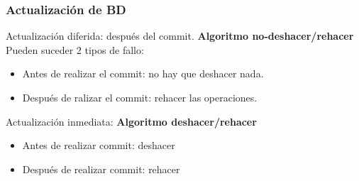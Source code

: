 \documentclass{article}
\begin{document}
\subsubsection{Actualización de BD}
Actualización diferida: después del commit. \textbf{Algoritmo no-deshacer/rehacer}
Pueden suceder 2 tipos de fallo:
\begin{itemize}
	\item Antes de realizar el commit: no hay que deshacer nada.
	\item Después de ralizar el commit: rehacer las operaciones.
\end{itemize}
Actualización inmediata:  \textbf{Algoritmo deshacer/rehacer}
\begin{itemize}
	\item Antes de realizar commit: deshacer
	\item Después de realizar commit: rehacer
\end{itemize}


\newpage





\end{document}
